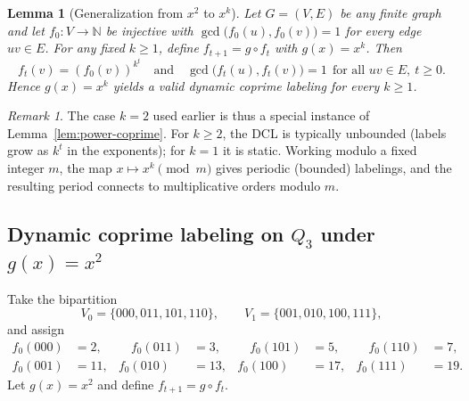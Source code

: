 \documentclass[12pt]{amsart}
\theoremstyle{plain}
\newtheorem{lemma}[thm]{Lemma}
\theoremstyle{definition}
\theoremstyle{remark}
\newtheorem{remark}[thm]{Remark}
\numberwithin{equation}{section}
\begin{document}
\begin{lemma}[Generalization from $x^2$ to $x^k$]\label{cor:generalize-xk}
Let $G=(V,E)$ be any finite graph and let $f_0:V\to\mathbb{N}$ be injective with $\gcd\!\bigl(f_0(u),f_0(v)\bigr)=1$ for every edge $uv\in E$.
For any fixed $k\ge 1$, define $f_{t+1}=g\circ f_t$ with $g(x)=x^k$. Then
\[
f_t(v)=(f_0(v))^{k^t}\quad\text{and}\quad \gcd\!\bigl(f_t(u),f_t(v)\bigr)=1\ \ \text{for all }uv\in E,\ t\ge 0.
\]
Hence $g(x)=x^k$ yields a valid dynamic coprime labeling for every $k\ge 1$.
\end{lemma}

\begin{remark}
The case $k=2$ used earlier is thus a special instance of Lemma~\ref{lem:power-coprime}. 
For $k\ge 2$, the DCL is typically unbounded (labels grow as $k^t$ in the exponents); for $k=1$ it is static. 
Working modulo a fixed integer $m$, the map $x\mapsto x^k\!\!\pmod m$ gives periodic (bounded) labelings, and the resulting period connects to multiplicative orders modulo $m$.
\end{remark}

\subsection*{Dynamic coprime labeling on $Q_3$ under $g(x)=x^2$}
Take the bipartition
\[
V_0=\{000,011,101,110\},\qquad V_1=\{001,010,100,111\},
\]
and assign
\[
\begin{aligned}
f_0(000)&=2,&\quad f_0(011)&=3,&\quad f_0(101)&=5,&\quad f_0(110)&=7,\\
f_0(001)&=11,& f_0(010)&=13,& f_0(100)&=17,& f_0(111)&=19.
\end{aligned}
\]
Let $g(x)=x^2$ and define $f_{t+1}=g\circ f_t$.
\end{document}
